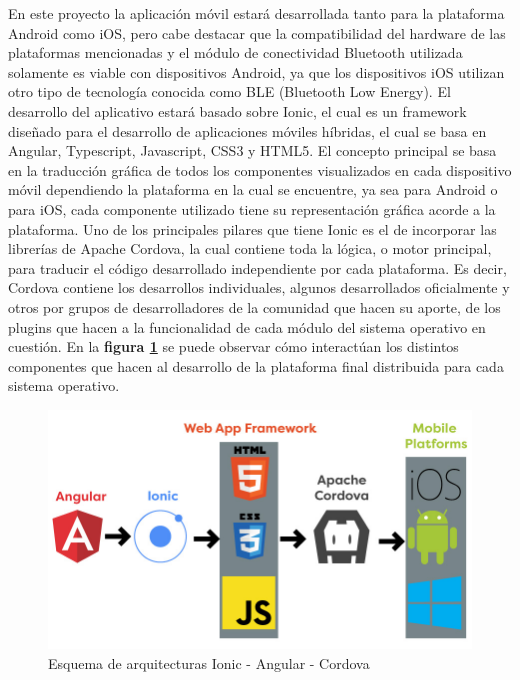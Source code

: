 \documentclass{IEEEtran}
\begin{document}
			En este proyecto la aplicación móvil estará desarrollada tanto para la plataforma Android como iOS, pero cabe destacar que la compatibilidad del hardware de las plataformas mencionadas y el módulo de conectividad Bluetooth utilizada solamente es viable con dispositivos Android, ya que los dispositivos iOS utilizan otro tipo de tecnología conocida como BLE (Bluetooth Low Energy).
			El desarrollo del aplicativo estará basado sobre Ionic, el cual es un framework diseñado para el desarrollo de aplicaciones móviles híbridas, el cual se basa en Angular, Typescript, Javascript, CSS3 y HTML5. El concepto principal se basa en la traducción gráfica de todos los componentes visualizados en cada dispositivo móvil dependiendo la plataforma en la cual se encuentre, ya sea para Android o para iOS, cada componente utilizado tiene su representación gráfica acorde a la plataforma.
			Uno de los principales pilares que tiene Ionic es el de incorporar las librerías de Apache Cordova, la cual contiene toda la lógica, o motor principal, para traducir el código desarrollado independiente por cada plataforma. Es decir, Cordova contiene los desarrollos individuales, algunos desarrollados oficialmente y otros por grupos de desarrolladores de la comunidad que hacen su aporte, de los plugins que hacen a la funcionalidad de cada módulo del sistema operativo en cuestión. En la \textbf{figura \ref{ionic-angular-cordova}} se puede observar cómo interactúan los distintos componentes que hacen al desarrollo de la plataforma final distribuida para cada sistema operativo.

			\begin{figure}
				\centering
				\includegraphics[width=1\linewidth]{ionic-angular-cordova}
				\caption{Esquema de arquitecturas Ionic - Angular - Cordova}
				\label{ionic-angular-cordova}
			\end{figure}
\end{document}
